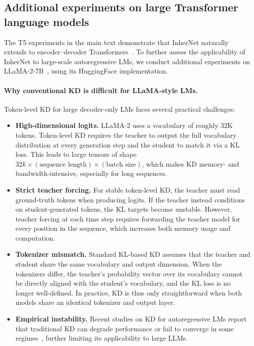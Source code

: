 \documentclass{article} %
\begin{document}
\subsection{Additional experiments on large Transformer language models}
\label{app:inhernet-llama}

The T5 experiments in the main text demonstrate that InherNet naturally extends to encoder--decoder Transformers~\cite{raffel2019exploring}. To further assess the applicability of InherNet to large-scale autoregressive LMs, we conduct additional experiments on LLaMA-2-7B~\cite{touvron2023llama}, using its HuggingFace implementation.

\paragraph{Why conventional KD is difficult for LLaMA-style LMs.}
Token-level KD for large decoder-only LMs faces several practical challenges:
\begin{itemize}[leftmargin=*, topsep=2pt, itemsep=2pt]
\item \textbf{High-dimensional logits.}
LLaMA-2 uses a vocabulary of roughly $32$K tokens. Token-level KD requires the teacher to output the full vocabulary distribution at every generation step and the student to match it via a KL loss. This leads to large tensors of shape $32k \times (\text{sequence length}) \times (\text{batch size})$, which makes KD memory- and bandwidth-intensive, especially for long sequences.
\item \textbf{Strict teacher forcing.}
For stable token-level KD, the teacher must read ground-truth tokens when producing logits. If the teacher instead conditions on student-generated tokens, the KL targets become unstable. However, teacher forcing at each time step requires forwarding the teacher model for every position in the sequence, which increases both memory usage and computation.
\item \textbf{Tokenizer mismatch.}
Standard KL-based KD assumes that the teacher and student share the same vocabulary and output dimension. When the tokenizers differ, the teacher's probability vector over its vocabulary cannot be directly aligned with the student's vocabulary, and the KL loss is no longer well-defined. In practice, KD is thus only straightforward when both models share an identical tokenizer and output layer.
\item \textbf{Empirical instability.}
Recent studies on KD for autoregressive LMs report that traditional KD can degrade performance or fail to converge in some regimes~\cite{gu2023minillm,zhong2024revisiting}, further limiting its applicability to large LLMs.
\end{itemize}
\end{document}
